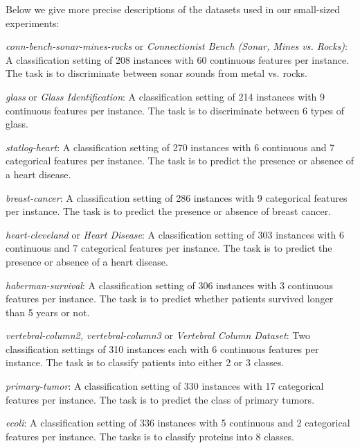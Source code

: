 \documentclass{article}
\theoremstyle{plain}
\theoremstyle{definition}
\theoremstyle{remark}
\begin{document}
Below we give more precise descriptions of the datasets used in our small-sized experiments:
\begin{description}[topsep=-1.5pt,itemsep=1.5pt]
    \item {\em conn-bench-sonar-mines-rocks} or  {\em Connectionist Bench (Sonar, Mines vs. Rocks)}: A classification setting of 208 instances with 60 continuous features per instance. The task is to discriminate between sonar sounds from metal vs. rocks.
    
    \item {\em glass} or {\em Glass Identification}: A classification setting of 214 instances with 9 continuous features per instance. The task is to discriminate between 6 types of glass.
    
    \item {\em statlog-heart}: A classification setting of 270 instances with 6 continuous and 7 categorical features per instance. The task is to predict the presence or absence of a heart disease.
    
    \item {\em breast-cancer}: A classification setting of 286 instances with 9 categorical features per instance. The task is to predict the presence or absence of breast cancer.
    
    \item {\em heart-cleveland} or {\em Heart Disease}: A classification setting of 303 instances with 6 continuous and 7 categorical features per instance. The task is to predict the presence or absence of a heart disease.
    
    \item {\em haberman-survival}: A classification setting of 306 instances with 3 continuous features per instance. The task is to predict whether patients survived longer than 5 years or not.
    
    \item {\em vertebral-column2, vertebral-column3} or {\em Vertebral Column Dataset}: Two classification settings of 310 instances each with 6 continuous features per instance. The task is to classify patients into either 2 or 3 classes.
    
    \item {\em primary-tumor}: A classification setting of 330 instances with 17 categorical features per instance. The task is to predict the class of primary tumors.
    
    \item {\em ecoli}: A classification setting of 336 instances with 5 continuous and 2 categorical features per instance. The tasks is to classify proteins into 8 classes.
    

\end{description}
\end{document}
